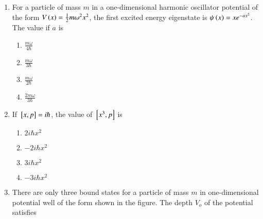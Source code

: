 \documentclass[journal]{IEEEtran}
\begin{document}
\begin{enumerate}
\begin{enumerate}
\end{enumerate}
\item For a particle of mass $m$ in a one-dimensional harmonic oscillator potential of the form $V\left(x\right)=\frac{1}{2}m\omega^2x^2$, the first excited energy eigenstate is $\psi\left(x\right) = xe^{-ax^2}$. The value if $a$ is 
\begin{enumerate}
    \item $\frac{m\omega}{4\hbar}$
    \item $\frac{m\omega}{3\hbar}$
    \item $\frac{m\omega}{2\hbar}$
    \item $\frac{2m\omega}{3\hbar}$
\end{enumerate}
\item If ${}\left[x,p\right]=i\hbar$, the value of ${}\left[x^3,p\right]$ is 
\begin{enumerate}
    \item $2i\hbar x^2$
    \item $-2i\hbar x^2$
    \item $3i\hbar x^2$
    \item $-3i\hbar x^2$
    
\end{enumerate}
\item There are only three bound states for a particle of mass $m$ in one-dimensional potential well of the form shown in the figure. The depth $V_o$ of the potential satisfies 

\end{enumerate}
\end{document}
